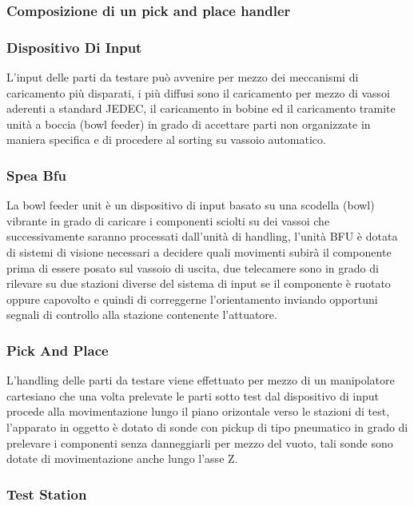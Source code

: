 \subsubsection{Composizione di un pick and place handler }

\subsubsection{Dispositivo Di Input }
L’input delle parti da testare può avvenire per mezzo dei meccanismi di caricamento più disparati, i più 
diffusi sono il caricamento per mezzo di vassoi aderenti a standard JEDEC, il caricamento in bobine ed il 
caricamento tramite unità a boccia (bowl feeder) in grado di accettare parti non organizzate in maniera 
specifica e di procedere al sorting su vassoio automatico.  

\subsubsection{Spea Bfu} 

La bowl feeder unit è un dispositivo di input basato su una scodella (bowl) vibrante in grado di caricare i 
componenti sciolti su dei vassoi che successivamente saranno processati dall’unità di handling, l’unità BFU 
è dotata di sistemi di visione necessari a decidere quali movimenti subirà il componente prima di essere 
posato sul vassoio di uscita, due telecamere sono in grado di rilevare su due stazioni diverse del sistema 
di input se il componente è ruotato oppure capovolto e quindi di correggerne l’orientamento inviando 
opportuni segnali di controllo alla stazione contenente l’attuatore.  

\subsubsection{Pick And Place}

L’handling delle parti da testare viene effettuato per mezzo di un manipolatore cartesiano che una volta 
prelevate le parti sotto test dal dispositivo di input procede alla movimentazione lungo il piano orizontale verso le stazioni di test, l’apparato in oggetto è dotato di sonde con pickup di tipo pneumatico in grado di prelevare i componenti senza danneggiarli per mezzo del vuoto, tali sonde sono dotate di 
movimentazione anche lungo l’asse Z.  

\subsubsection{Test Station} 

